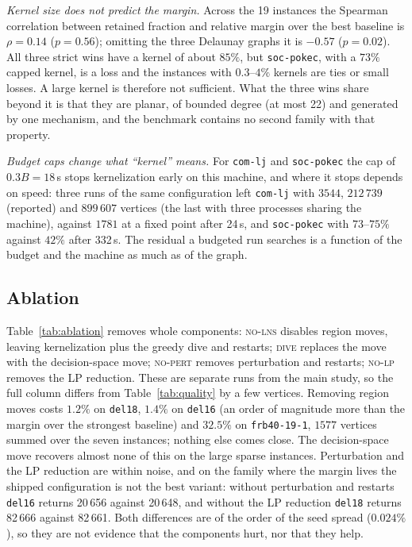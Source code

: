 \documentclass[pdflatex,sn-mathphys-num]{sn-jnl}
\theoremstyle{thmstyleone}%
\theoremstyle{thmstyletwo}%
\begin{document}
\emph{Kernel size does not predict the margin.} Across the 19 instances the Spearman
correlation between retained fraction and relative margin over the best baseline is
$\rho=0.14$ ($p=0.56$); omitting the three Delaunay graphs it is $-0.57$ ($p=0.02$).
All three strict wins have a kernel of about $85\%$, but \texttt{soc-pokec}, with a
$73\%$ capped kernel, is a loss and the instances with $0.3$--$4\%$ kernels are ties or
small losses. A large kernel is therefore not sufficient. What the three wins share
beyond it is that they are planar, of bounded degree (at most 22) and generated by one
mechanism, and the benchmark contains no second family with that property.

\emph{Budget caps change what ``kernel'' means.} For \texttt{com-lj} and
\texttt{soc-pokec} the cap of $0.3B=18$\,s stops kernelization early on this machine,
and where it stops depends on speed: three runs of the same configuration left
\texttt{com-lj} with $3544$, $212\,739$ (reported) and $899\,607$ vertices (the last with
three processes sharing the machine), against $1781$ at a fixed point after 24\,s, and
\texttt{soc-pokec} with $73$--$75\%$ against $42\%$ after 332\,s. The residual a budgeted
run searches is a function of the budget and the machine as much as of the graph.

\subsection{Ablation}
\label{sec:ablation}

Table~\ref{tab:ablation} removes whole components: \textsc{no-lns} disables region
moves, leaving kernelization plus the greedy dive and restarts; \textsc{dive} replaces
the move with the decision-space move; \textsc{no-pert} removes perturbation and
restarts; \textsc{no-lp} removes the LP reduction. These are separate runs from the main
study, so the full column differs from Table~\ref{tab:quality} by a few vertices.
Removing region moves costs $1.2\%$ on \texttt{del18}, $1.4\%$ on \texttt{del16} (an order
of magnitude more than the margin over the strongest baseline) and $32.5\%$ on
\texttt{frb40-19-1}, $1577$ vertices summed over the seven instances; nothing else comes
close. The decision-space move recovers almost none of this on the large sparse
instances. Perturbation and the LP reduction are within noise, and on the family where
the margin lives the shipped configuration is not the best variant: without
perturbation and restarts \texttt{del16} returns 20\,656 against 20\,648, and without
the LP reduction \texttt{del18} returns 82\,666 against 82\,661. Both differences are of
the order of the seed spread ($0.024\%$), so they are not evidence that the components
hurt, nor that they help.
\end{document}

